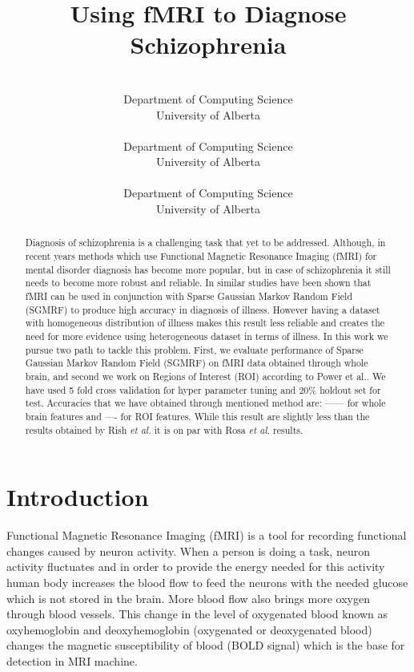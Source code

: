 \documentclass{article} %
\title{Using fMRI to Diagnose Schizophrenia}
\author{%
	\\
	Department of Computing Science\\
	University of Alberta\\
	\texttt{} 
\And 
 \\
Department of Computing Science\\
University of Alberta\\
\texttt{}
\And 
\\
Department of Computing Science\\
University of Alberta\\
\texttt{}  
}
\begin{document}
	\maketitle

\begin{abstract}
Diagnosis of schizophrenia is a challenging task that yet to be 
addressed\cite{McGuire200891}. Although, in recent years methods which use 
Functional Magnetic Resonance Imaging (fMRI) for mental disorder diagnosis has 
become more popular, but in case of schizophrenia it still needs to become 
more robust and reliable. In similar studies\cite{Rish_2013}\cite{Rosa_2013} 
have been shown that fMRI can be used in conjunction with Sparse Gaussian 
Markov Random Field (SGMRF) to produce high accuracy in diagnosis of illness. 
However having a dataset with homogeneous distribution of illness makes this 
result less reliable and creates the need for more evidence using 
heterogeneous dataset in terms of illness. In this work we pursue two path to 
tackle this problem. First, we evaluate performance of Sparse Gaussian Markov 
Random Field (SGMRF) on fMRI data obtained through whole brain, and second we 
work on Regions of Interest (ROI) according to Power et al.\cite{Power_2011}. 
We have used 5 fold cross validation for hyper parameter tuning and $20\%$ 
holdout set for test. Accuracies that we have obtained through mentioned 
method are: ------ for whole brain features and ---- for ROI features. While 
this result are slightly less than the results obtained by Rish \emph{et al.} 
it is on par with Rosa \emph{et al.} results.  
\end{abstract}


\section{Introduction}
Functional Magnetic Resonance Imaging (fMRI) is a tool for recording 
functional changes caused by neuron activity. When a person is doing a task, 
neuron activity fluctuates and  in order to provide the energy 
needed for this activity human body increases the blood flow to feed the neurons with 
the needed glucose which is not stored in the brain. More blood flow also 
brings more oxygen through blood vessels. This change in the level of 
oxygenated blood known as oxyhemoglobin and deoxyhemoglobin (oxygenated or 
deoxygenated blood) changes the magnetic susceptibility of blood (BOLD signal) 
which is the base for detection in MRI machine. \\
\end{document}
